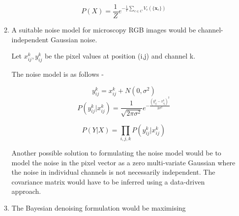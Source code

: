 \documentclass[11pt]{article}
\begin{document}
\begin{enumerate}
\begin{enumerate}
        $$
        P(X) = \frac{1}{Z}e^{-\frac{1}{T}\sum_{c \in C} V_c(\{\boldsymbol{x}_c\})}
        $$
        
        \item A suitable noise model for microscopy RGB images would be channel-independent Gaussian noise.
        
        Let $x_{ij}^k,y_{ij}^k$ be the pixel values at position (i,j) and channel k.
        
        The noise model is as follows - 
        
        $$
        y_{ij}^k = x_{ij}^k + N(0,\sigma^2)
        $$
        $$
        P(y_{ij}^k | x_{ij}^k) = \frac{1}{\sqrt{2\pi\sigma^2}}e^{-\frac{(y_{ij}^k - x_{ij}^k)^2}{2\sigma^2}}
        $$
        
        $$
        P(Y|X) = \prod_{i,j,k} P(y_{ij}^k | x_{ij}^k)
        $$
        
        Another possible solution to formulating the noise model would be to model the noise in the pixel vector as a zero multi-variate Gaussian where the noise in individual channels is not necessarily independent. 
        The covariance matrix would have to be inferred using a data-driven approach.
        
        \item The Bayesian denoising formulation would be maximising 
    \end{enumerate}
\end{enumerate}
\end{document}
